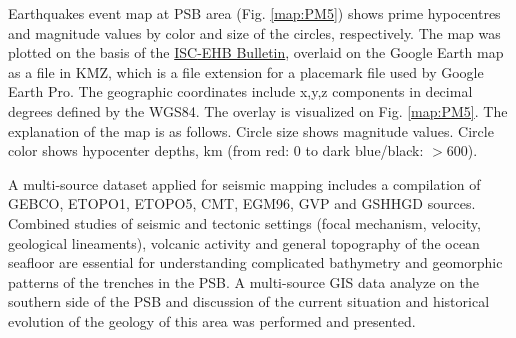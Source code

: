 \documentclass[11pt,a4paper]{report}
\begin{document}
{Earthquakes event map at \ac{PSB} area (Fig. \ref{map:PM5}) shows prime hypocentres and magnitude values by color and size of the circles, respectively. The map was plotted on the basis of the \href{http://www.isc.ac.uk/isc-ehb/search/catalogue/}{\ac{ISC}-EHB Bulletin}, overlaid on the Google Earth map as a file in \ac{KMZ}, which is a file extension for a placemark file used by Google Earth Pro. The geographic coordinates include x,y,z components in decimal degrees defined by the \ac{WGS84}. The overlay is visualized on Fig. \ref{map:PM5}. The explanation of the map is as follows. Circle size shows magnitude values. Circle color shows hypocenter depths, km (from red: 0 to dark blue/black: $>600$). 

A multi-source dataset applied for seismic mapping includes a compilation of \ac{GEBCO}, \ac{ETOPO1}, \ac{ETOPO5}, \ac{CMT}, \ac{EGM96}, \ac{GVP} and \ac{GSHHGD} sources. Combined studies of seismic and tectonic settings (focal mechanism, velocity, geological lineaments), volcanic activity and general topography of the ocean seafloor are essential for understanding complicated bathymetry and geomorphic patterns of the trenches in the \ac{PSB}. A multi-source \ac{GIS} data analyze on the southern side of the \ac{PSB} and discussion of the current situation and historical evolution of the geology of this area was performed and presented. 

}
\end{document}
